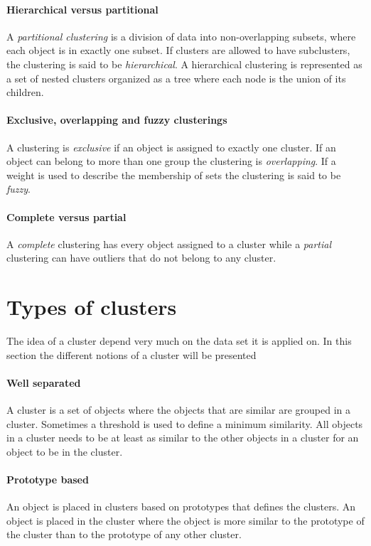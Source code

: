 \paragraph{Hierarchical versus partitional}
A \textit{partitional clustering} is a division of data into non-overlapping subsets, where each object is in exactly one subset.
If clusters are allowed to have subclusters, the clustering is said to be \textit{hierarchical}.
A hierarchical clustering is represented as a set of nested clusters organized as a tree where each node is the union of its children.

\paragraph{Exclusive, overlapping and fuzzy clusterings}

A clustering is \textit{exclusive} if an object is assigned to exactly one cluster.
If an object can belong to more than one group the clustering is \textit{overlapping}.
If a weight is used to describe the membership of sets the clustering is said to be \textit{fuzzy}.

\paragraph{Complete versus partial}

A \textit{complete} clustering has every object assigned to a cluster while a \textit{partial} clustering can have outliers that do not belong to any cluster.

\section{Types of clusters}
The idea of a cluster depend very much on the data set it is applied on.
In this section the different notions of a cluster will be presented

\paragraph{Well separated}
A cluster is a set of objects where the objects that are similar are grouped in a cluster. 
Sometimes a threshold is used to define a minimum similarity. 
All objects in a cluster needs to be at least as similar to the other objects in a cluster for an object to be in the cluster.

\paragraph{Prototype based}
An object is placed in clusters based on prototypes that defines the clusters.
An object is placed in the cluster where the object is more similar to the prototype of the cluster than to the prototype of any other cluster.

